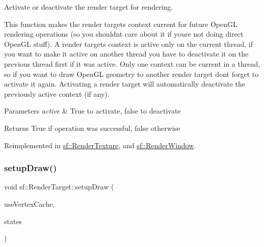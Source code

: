 Activate or deactivate the render target for rendering. 

This function makes the render target\textquotesingle{}s context current for future Open\+GL rendering operations (so you shouldn\textquotesingle{}t care about it if you\textquotesingle{}re not doing direct Open\+GL stuff). A render target\textquotesingle{}s context is active only on the current thread, if you want to make it active on another thread you have to deactivate it on the previous thread first if it was active. Only one context can be current in a thread, so if you want to draw Open\+GL geometry to another render target don\textquotesingle{}t forget to activate it again. Activating a render target will automatically deactivate the previously active context (if any).


\begin{DoxyParams}{Parameters}
{\em active} & True to activate, false to deactivate\\
\hline
\end{DoxyParams}
\begin{DoxyReturn}{Returns}
True if operation was successful, false otherwise \begin{DoxyVerb}\end{DoxyVerb}
 
\end{DoxyReturn}


Reimplemented in \mbox{\hyperlink{classsf_1_1_render_texture_a5da95ecdbce615a80bb78399012508cf}{sf\+::\+Render\+Texture}}, and \mbox{\hyperlink{classsf_1_1_render_window_aee6c53eced675e885931eb3e91f11155}{sf\+::\+Render\+Window}}.

\mbox{\label{classsf_1_1_render_target_a92af454dcbd48a1d211411cbb306754e}} 
\subsubsection{\texorpdfstring{setupDraw()}{setupDraw()}}
{\footnotesize\ttfamily void sf\+::\+Render\+Target\+::setup\+Draw (\begin{DoxyParamCaption}\item[{bool}]{use\+Vertex\+Cache,  }\item[{const \mbox{\hyperlink{classsf_1_1_render_states}{Render\+States}} \&}]{states }\end{DoxyParamCaption})\hspace{0.3cm}{\ttfamily [private]}}



